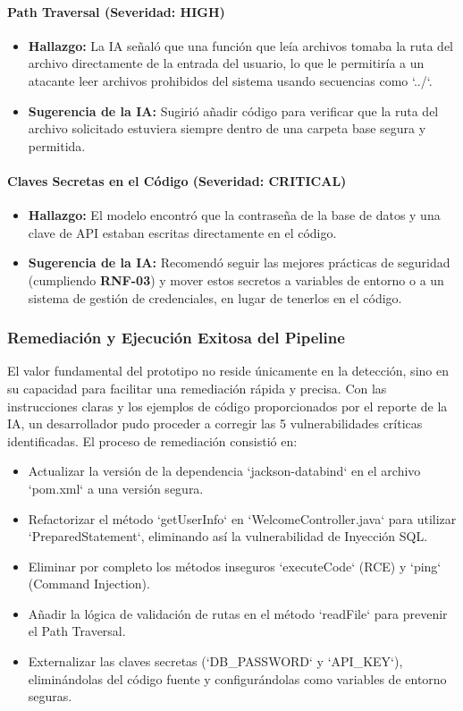 \paragraph{Path Traversal (Severidad: HIGH)}
\begin{itemize}
    \item \textbf{Hallazgo:} La IA señaló que una función que leía archivos tomaba la ruta del archivo directamente de la entrada del usuario, lo que le permitiría a un atacante leer archivos prohibidos del sistema usando secuencias como `../`.
    \item \textbf{Sugerencia de la IA:} Sugirió añadir código para verificar que la ruta del archivo solicitado estuviera siempre dentro de una carpeta base segura y permitida.
\end{itemize}

\paragraph{Claves Secretas en el Código (Severidad: CRITICAL)}
\begin{itemize}
    \item \textbf{Hallazgo:} El modelo encontró que la contraseña de la base de datos y una clave de API estaban escritas directamente en el código.
    \item \textbf{Sugerencia de la IA:} Recomendó seguir las mejores prácticas de seguridad (cumpliendo \textbf{RNF-03}) y mover estos secretos a variables de entorno o a un sistema de gestión de credenciales, en lugar de tenerlos en el código.
\end{itemize}
\subsubsection{Remediación y Ejecución Exitosa del Pipeline}
\label{subsec:remediacion_exitosa}

El valor fundamental del prototipo no reside únicamente en la detección, sino en su capacidad para facilitar una remediación rápida y precisa. Con las instrucciones claras y los ejemplos de código proporcionados por el reporte de la IA, un desarrollador pudo proceder a corregir las 5 vulnerabilidades críticas identificadas. El proceso de remediación consistió en:
\begin{itemize}
    \item Actualizar la versión de la dependencia `jackson-databind` en el archivo `pom.xml` a una versión segura.
    \item Refactorizar el método `getUserInfo` en `WelcomeController.java` para utilizar `PreparedStatement`, eliminando así la vulnerabilidad de Inyección SQL.
    \item Eliminar por completo los métodos inseguros `executeCode` (RCE) y `ping` (Command Injection).
    \item Añadir la lógica de validación de rutas en el método `readFile` para prevenir el Path Traversal.
    \item Externalizar las claves secretas (`DB_PASSWORD` y `API_KEY`), eliminándolas del código fuente y configurándolas como variables de entorno seguras.
\end{itemize}

